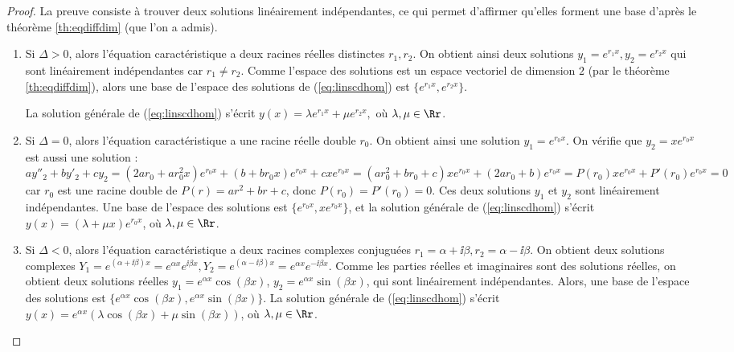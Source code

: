 \documentclass[class=report,crop=false]{standalone}
\begin{document}
\begin{proof}
La preuve consiste à trouver deux solutions linéairement indépendantes,
ce qui permet d'affirmer qu'elles forment une base d'après
le théorème \ref{th:eqdiffdim} (que l'on a admis).
\begin{enumerate}
  \item Si $\Delta>0$, alors l'équation caractéristique a deux racines réelles
distinctes $r_1, r_2$. On obtient ainsi deux solutions $y_1=e^{r_1x},
y_2=e^{r_2x}$ qui sont linéairement indépendantes car $r_1 \neq r_2$.
Comme l'espace des solutions est un espace vectoriel de dimension $2$
(par le théorème \ref{th:eqdiffdim}), alors une base de
l'espace des solutions de (\ref{eq:linscdhom})
est $\big\{e^{r_1x}, e^{r_2x}\big\}$.

La solution générale de  (\ref{eq:linscdhom}) s'écrit
$y(x) = \lambda e^{r_1x} + \mu e^{r_2x},$ où $\lambda,
\mu\in\Rr$.

  \item Si $\Delta=0$, alors l'équation caractéristique a
une racine réelle double $r_0$. On
obtient ainsi une solution $y_1=e^{r_0x}$. On vérifie que $y_2=xe^{r_0x}$
est aussi une solution :
$ay''_2+by'_2+cy_2 = 
(2ar_0+ar_0^2x)e^{r_0x}+(b+br_0x)e^{r_0x}+cxe^{r_0x}
= (ar_0^2 + br_0 +c)xe^{r_0x} + (2ar_0+b)e^{r_0x}
= P(r_0)xe^{r_0x} + P'(r_0)e^{r_0x}=0$ car $r_0$ est une racine double de $P(r) = ar^2+br+c$, donc $P(r_0)=P'(r_0)=0$.
Ces deux solutions $y_1$ et $y_2$ sont linéairement indépendantes.
Une base de l'espace des solutions est $\big\{e^{r_0x}, xe^{r_0x}\big\}$,
et la solution générale de  (\ref{eq:linscdhom}) s'écrit
$y(x) = (\lambda  + \mu x) e^{r_0x}$, où $\lambda,\mu \in\Rr$.

  \item Si $\Delta<0$, alors l'équation caractéristique a deux
racines complexes conjuguées $r_1=\alpha+\ii\beta, r_2=\alpha-\ii\beta$.
On obtient deux solutions complexes $Y_1=e^{(\alpha+\ii\beta)x}=e^{\alpha x}e^{\ii\beta x},
Y_2=e^{(\alpha-\ii\beta)x}=e^{\alpha x}e^{-\ii\beta x}$.
Comme les parties réelles et imaginaires sont des
solutions réelles, on obtient deux solutions réelles
$y_1=e^{\alpha x}\cos(\beta x)$, $y_2=e^{\alpha x}\sin(\beta x)$, qui sont
linéairement indépendantes.
Alors, une base de l'espace des solutions est
$\big\{e^{\alpha x}\cos(\beta x), e^{\alpha x}\sin(\beta x)\big\}$.
La solution générale de (\ref{eq:linscdhom}) s'écrit
$y(x)=e^{\alpha x}(\lambda \cos(\beta x) +
\mu\sin(\beta x))$, où $\lambda,\mu \in \Rr$.
\end{enumerate}
\end{proof}
\end{document}
